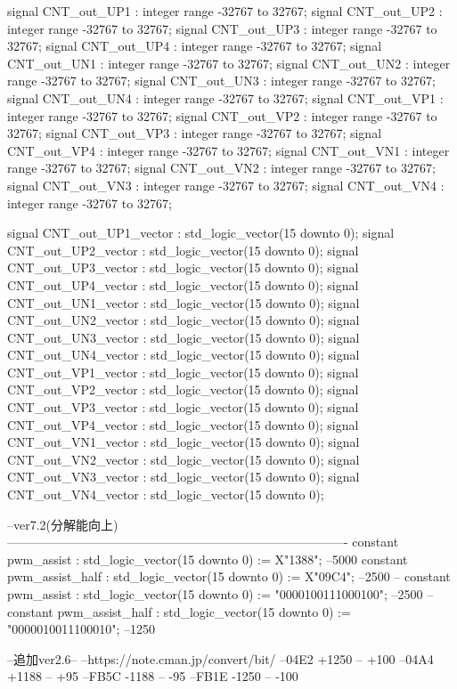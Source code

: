 \begin{mylisting}[language=VHDL,caption=ゲート信号出力モジュール,label=MMC_PWM_GEN_module_VHDL]
	signal 	CNT_out_UP1						: integer range -32767 to 32767;
	signal 	CNT_out_UP2						: integer range -32767 to 32767;
	signal 	CNT_out_UP3						: integer range -32767 to 32767;
	signal 	CNT_out_UP4						: integer range -32767 to 32767;
	signal 	CNT_out_UN1						: integer range -32767 to 32767;
	signal 	CNT_out_UN2						: integer range -32767 to 32767;
	signal 	CNT_out_UN3						: integer range -32767 to 32767;
	signal 	CNT_out_UN4						: integer range -32767 to 32767;
	signal 	CNT_out_VP1						: integer range -32767 to 32767;
	signal 	CNT_out_VP2						: integer range -32767 to 32767;
	signal 	CNT_out_VP3						: integer range -32767 to 32767;
	signal 	CNT_out_VP4						: integer range -32767 to 32767;
	signal 	CNT_out_VN1						: integer range -32767 to 32767;
	signal 	CNT_out_VN2						: integer range -32767 to 32767;
	signal 	CNT_out_VN3						: integer range -32767 to 32767;
	signal 	CNT_out_VN4						: integer range -32767 to 32767;

 	signal 	CNT_out_UP1_vector			: std_logic_vector(15 downto 0);
 	signal 	CNT_out_UP2_vector			: std_logic_vector(15 downto 0);
 	signal 	CNT_out_UP3_vector			: std_logic_vector(15 downto 0);
 	signal 	CNT_out_UP4_vector			: std_logic_vector(15 downto 0);
 	signal 	CNT_out_UN1_vector			: std_logic_vector(15 downto 0);
 	signal 	CNT_out_UN2_vector			: std_logic_vector(15 downto 0);
 	signal 	CNT_out_UN3_vector			: std_logic_vector(15 downto 0);
 	signal 	CNT_out_UN4_vector			: std_logic_vector(15 downto 0);
 	signal 	CNT_out_VP1_vector			: std_logic_vector(15 downto 0);
 	signal 	CNT_out_VP2_vector			: std_logic_vector(15 downto 0);
 	signal 	CNT_out_VP3_vector			: std_logic_vector(15 downto 0);
 	signal 	CNT_out_VP4_vector			: std_logic_vector(15 downto 0);
 	signal 	CNT_out_VN1_vector			: std_logic_vector(15 downto 0);
 	signal 	CNT_out_VN2_vector			: std_logic_vector(15 downto 0);
 	signal 	CNT_out_VN3_vector			: std_logic_vector(15 downto 0);
 	signal 	CNT_out_VN4_vector			: std_logic_vector(15 downto 0);
	


	--ver7.2(分解能向上)----------------------------------------------------------------------------------
	constant pwm_assist						: std_logic_vector(15 downto 0) := X"1388"; --5000
	constant pwm_assist_half				: std_logic_vector(15 downto 0) := X"09C4"; --2500	
--	constant pwm_assist						: std_logic_vector(15 downto 0) := "0000100111000100"; --2500
--	constant pwm_assist_half				: std_logic_vector(15 downto 0) := "0000010011100010"; --1250

	--追加ver2.6--
	--https://note.cman.jp/convert/bit/
	--04E2 +1250 -- +100%
	--04A4 +1188 -- +95%
	--FB5C -1188 -- -95%
	--FB1E -1250 -- -100%
	

\end{mylisting}
